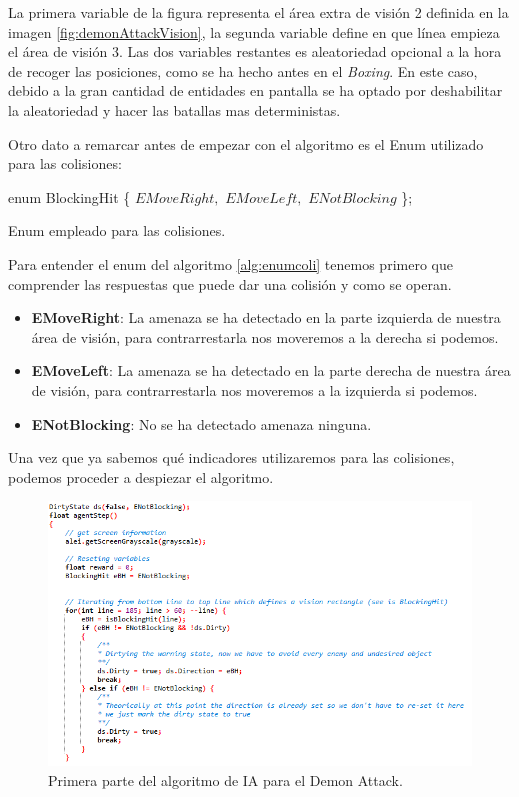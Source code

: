 La primera variable de la figura representa el área extra de visión 2 definida en la imagen \ref{fig:demonAttackVision}, la segunda variable define en que línea empieza el área de visión 3. Las dos variables restantes es aleatoriedad opcional a la hora de recoger las posiciones, como se ha hecho antes en el \textit{Boxing}. En este caso, debido a la gran cantidad de entidades en pantalla se ha optado por deshabilitar la aleatoriedad y hacer las batallas mas deterministas.

Otro dato a remarcar antes de empezar con el algoritmo es el Enum utilizado para las colisiones:

\vspace{4mm}
\begin{algorithm}[H]
	enum BlockingHit \{
		$EMoveRight,$
		$EMoveLeft,$
		$ENotBlocking$
	\};
	\caption{Enum empleado para las colisiones.}
	\label{alg:enumcoli}
\end{algorithm}

\vspace{4mm}
Para entender el enum del algoritmo \ref{alg:enumcoli} tenemos primero que comprender las respuestas que puede dar una colisión y como se operan. 

\begin{itemize}
	\item \textbf{EMoveRight}: La amenaza se ha detectado en la parte izquierda de nuestra área de visión, para contrarrestarla nos moveremos a la derecha si podemos.
	\item \textbf{EMoveLeft}: La amenaza se ha detectado en la parte derecha de nuestra área de visión, para contrarrestarla nos moveremos a la izquierda si podemos.
	\item \textbf{ENotBlocking}: No se ha detectado amenaza ninguna.
\end{itemize}

\newpage
Una vez que ya sabemos qué indicadores utilizaremos para las colisiones, podemos proceder a despiezar el algoritmo.

\begin{figure}[h]
	\centering
	\includegraphics[width=1\textwidth]{Figures/demonattackp1algo}
	\caption{Primera parte del algoritmo de IA para el Demon Attack.}
	\label{fig:demonattackp1algo}
\end{figure}

